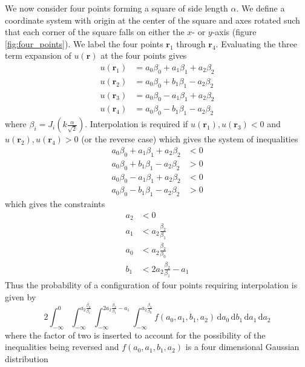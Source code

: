 \documentclass{report}
\newcommand{\rr}[0]{\mathbf{r}}
\newcommand{\ud}{\,\mathrm{d}}
\begin{document}
We now consider four points forming a square of side length $\alpha$. We define a coordinate system with origin at the center of the square and axes rotated such that each corner of the square falls on either the $x$- or $y$-axis (figure \ref{fig:four_points}). We label the four points $\rr_{1}$ through $\rr_{4}$. Evaluating the three term expansion of $u(\rr)$ at the four points gives
\begin{align*}
  u(\rr_{1}) & = a_{0} \beta_{0} + a_{1} \beta_{1} + a_{2} \beta_{2} \\
  u(\rr_{2}) & = a_{0} \beta_{0} + b_{1} \beta_{1} - a_{2} \beta_{2} \\
  u(\rr_{3}) & = a_{0} \beta_{0} - a_{1} \beta_{1} + a_{2} \beta_{2} \\
  u(\rr_{4}) & = a_{0} \beta_{0} - b_{1} \beta_{1} - a_{2} \beta_{2}
\end{align*}
where $\beta_{i} = J_{i} \left( k \frac{\alpha}{\sqrt{2}} \right)$. Interpolation is required if $u(\rr_{1}), u(\rr_{3}) < 0$ and $u(\rr_{2}), u(\rr_{4}) > 0$ (or the reverse case) which gives the system of inequalities
\begin{align*}
  a_{0} \beta_{0} + a_{1} \beta_{1} + a_{2} \beta_{2} & < 0 \\
  a_{0} \beta_{0} + b_{1} \beta_{1} - a_{2} \beta_{2} & > 0 \\
  a_{0} \beta_{0} - a_{1} \beta_{1} + a_{2} \beta_{2} & < 0 \\
  a_{0} \beta_{0} - b_{1} \beta_{1} - a_{2} \beta_{2} & > 0
\end{align*}
which gives the constraints
\begin{align*}
  a_{2} & < 0 \\
  a_{1} & < a_{2} \frac{\beta_{2}}{\beta_{1}} \\
  a_{0} & < a_{2} \frac{\beta_{2}}{\beta_{0}} \\
  b_{1} & < 2 a_{2} \frac{\beta_{2}}{\beta_{1}} - a_{1}
\end{align*}
Thus the probability of a configuration of four points requiring interpolation is given by
\begin{equation}
  2 \int_{-\infty}^{0} \int_{-\infty}^{a_{2} \frac{\beta_{2}}{\beta_{1}}} \int_{-\infty}^{2 a_{2} \frac{\beta_{2}}{\beta_{1}} - a_{1}} \int_{-\infty}^{a_{2} \frac{\beta_{2}}{\beta_{0}}} f(a_{0}, a_{1}, b_{1}, a_{2}) \ud a_{0} \ud b_{1} \ud a_{1} \ud a_{2}
\end{equation}
where the factor of two is inserted to account for the possibility of the inequalities being reversed and $f(a_{0}, a_{1}, b_{1}, a_{2})$ is a four dimensional Gaussian distribution
\end{document}
